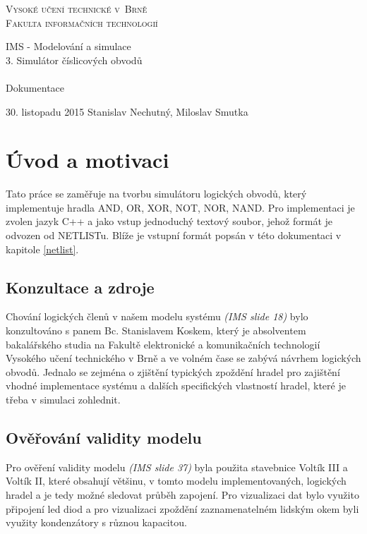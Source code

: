 \documentclass[11pt,a4paper]{article}
\author{Stanislav Nechutný}
\begin{document}
	\newcommand{\slideRef}[1]{\textit{(IMS slide #1)}}

	\begin{titlepage}

		\begin{center}

			\textsc{
				\Huge
					Vysoké učení technické v~Brně\\
				\huge
					Fakulta informačních technologií
			}\\


			\LARGE
					IMS - Modelování a simulace\\
					3. Simulátor číslicových obvodů\\~\\
			\Huge{}
					Dokumentace

		\end{center}

		{\Large
			30. listopadu 2015
			\hfill
			Stanislav Nechutný, Miloslav Smutka
		}

	\end{titlepage}


	\section{Úvod a motivaci}
		Tato práce se zaměřuje na tvorbu simulátoru logických obvodů, který implementuje hradla AND, OR, XOR, NOT, NOR, NAND. Pro implementaci je zvolen jazyk C++ a jako vstup jednoduchý textový soubor, jehož formát je odvozen od NETLISTu. Blíže je vstupní formát popsán v této dokumentaci v kapitole \ref{netlist}.
		
		
			
		\subsection{Konzultace a zdroje}
			Chování logických členů v našem modelu systému \slideRef{18} bylo konzultováno s panem Bc. Stanislavem Koskem, který je absolventem bakalářského studia na Fakultě elektronické a komunikačních technologií Vysokého učení technického v Brně a ve volném čase se zabývá návrhem logických obvodů. Jednalo se zejména o zjištění typických zpoždění hradel pro zajištění vhodné implementace systému a dalších specifických vlastností hradel, které je třeba v simulaci zohlednit.
			
		\subsection{Ověřování validity modelu}
			Pro ověření validity modelu \slideRef{37} byla použita stavebnice Voltík III a Voltík II, které obsahují většinu, v tomto modelu implementovaných, logických hradel a je tedy možné sledovat průběh zapojení. Pro vizualizaci dat bylo využito připojení led diod a pro vizualizaci zpoždění zaznamenatelném lidským okem byli využity kondenzátory s různou kapacitou.
			
\end{document}
